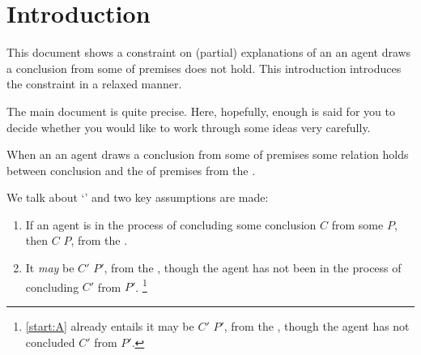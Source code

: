 \chapter{Introduction}
\label{cha:introduction}


\begin{note}
  This document shows a constraint on (partial) explanations of an  an agent draws a conclusion from some \pool{} of premises does not hold.
  This introduction introduces the constraint in a relaxed manner.

  The main document is quite precise.
  Here, hopefully, enough is said for you to decide whether you would like to work through some ideas very carefully.
\end{note}


\begin{note}
  When an  an agent draws a conclusion from some \pool{} of premises some relation holds between conclusion and the \pool{} of premises from the \agpe{}.

  We talk about `' and two key assumptions are made:
  \begin{enumerate}[label=\Alph*., ref=(\Alph*)]
  \item
    \label{start:A}
    If an agent is in the process of concluding some conclusion \(C\) from some \pool{} \(P\), then \(C\) \fof{} \(P\), from the \agpe{}.
  \item
    \label{start:B}
    It \emph{may} be \(C'\) \fof{} \(P'\), from the \agpe{}, though the agent has not been in the process of concluding \(C'\) from \(P'\).%
    \footnote{
      \ref{start:A} already entails it may be \(C'\) \fof{} \(P'\), from the \agpe{}, though the agent has not concluded \(C'\) from \(P'\).
    }
  \end{enumerate}
\end{note}

